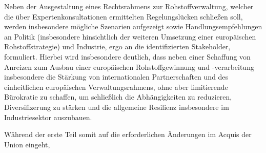 \documentclass[12pt,a4paper,oneside]{book} %
\begin{document}
Neben der Ausgestaltung eines Rechtsrahmens zur Rohstoffverwaltung, welcher die über Expertenkonsultationen ermittelten Regelungslücken schließen soll, werden insbesondere mögliche Szenarien aufgezeigt sowie Handlungsempfehlungen an Politik (insbesondere hinsichtlich der weiteren Umsetzung einer europäischen Rohstoffstrategie) und Industrie, ergo an die identifizierten Stakeholder, formuliert. Hierbei wird insbesondere deutlich, dass neben einer Schaffung von Anreizen zum Ausbau einer europäischen Rohstoffgewinnung und -verarbeitung insbesondere die Stärkung von internationalen Partnerschaften und des einheitlichen europäischen Verwaltungsrahmens, ohne aber limitierende Bürokratie zu schaffen, um schließlich die Abhängigkeiten zu reduzieren, Diversifizerung zu stärken und die allgemeine Resilienz insbesondere im Industriesektor auszubauen.

Während der erste Teil somit auf die erforderlichen Änderungen im Acquis der Union eingeht, 
\end{document}
